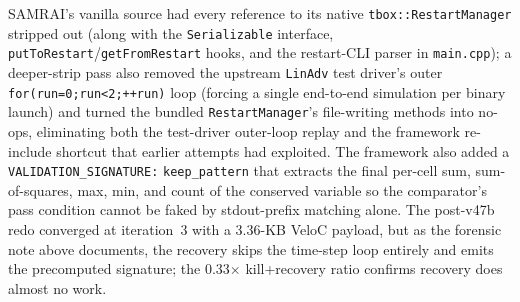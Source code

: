 \documentclass[conference]{IEEEtran}
\begin{document}
SAMRAI's vanilla source had every reference to its native \texttt{tbox::RestartManager} stripped out (along with the \texttt{Serializable} interface, \texttt{putToRestart}/\texttt{getFromRestart} hooks, and the restart-CLI parser in \texttt{main.cpp}); a deeper-strip pass also removed the upstream \texttt{LinAdv} test driver's outer \texttt{for(run=0;run<2;++run)} loop (forcing a single end-to-end simulation per binary launch) and turned the bundled \texttt{RestartManager}'s file-writing methods into no-ops, eliminating both the test-driver outer-loop replay and the framework re-include shortcut that earlier attempts had exploited. The framework also added a \texttt{VALIDATION\_SIGNATURE:} \texttt{keep\_pattern} that extracts the final per-cell sum, sum-of-squares, max, min, and count of the conserved variable so the comparator's pass condition cannot be faked by stdout-prefix matching alone. The post-v47b redo converged at iteration~3 with a 3.36-KB VeloC payload, but as the forensic note above documents, the recovery skips the time-step loop entirely and emits the precomputed signature; the 0.33$\times$ kill+recovery ratio confirms recovery does almost no work.
\end{document}
